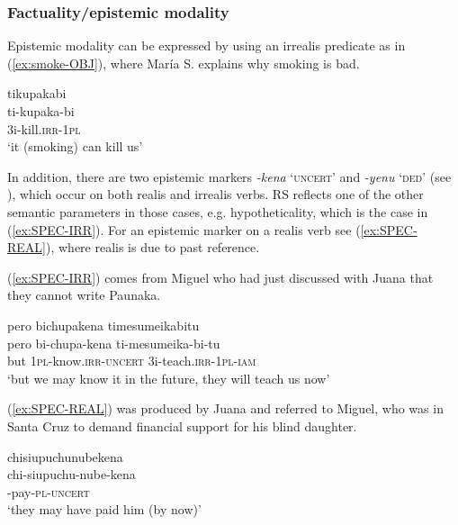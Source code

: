 \subsubsection{Factuality/epistemic modality}\label{par:IRR-factuality_epistemic_modality}

Epistemic modality can be expressed by using an irrealis predicate as in (\ref{ex:smoke-OBJ}), where María S. explains why smoking is bad.

\ea\label{ex:smoke-OBJ}
\begingl
\glpreamble tikupakabi\\
\gla ti-kupaka-bi\\
\glb 3i-kill.\textsc{irr}-1\textsc{pl}\\
\glft ‘it (smoking) can kill us’
\endgl
 \trailingcitation{[rxx-e120511l.385]}
\xe
{}

In addition, there are two epistemic markers  \textit{-kena} ‘\textsc{uncert}’ and \textit{-yenu} ‘\textsc{ded}’ (see ), which occur on both realis and irrealis verbs. RS reflects one of the other semantic parameters in those cases, e.g. hypotheticality, which is the case in (\ref{ex:SPEC-IRR}). For an epistemic marker on a realis verb see (\ref{ex:SPEC-REAL}), where realis is due to past reference.

(\ref{ex:SPEC-IRR}) comes from Miguel who had just discussed with Juana that they cannot write Paunaka.

\ea\label{ex:SPEC-IRR}
\begingl 
\glpreamble pero bichupakena timesumeikabitu \\
\gla pero bi-chupa-kena ti-mesumeika-bi-tu\\ 
\glb but 1\textsc{pl}-know.\textsc{irr}-\textsc{uncert} 3i-teach.\textsc{irr}-1\textsc{pl}-\textsc{iam}\\ 
\glft ‘but we may know it in the future, they will teach us now’\\ 
\endgl
 \trailingcitation{[jmx-e090727s.031]}
\xe

(\ref{ex:SPEC-REAL}) was produced by Juana and referred to Miguel, who was in Santa Cruz to demand financial support for his blind daughter.

\ea\label{ex:SPEC-REAL}
\begingl 
\glpreamble chisiupuchunubekena\\
\gla chi-siupuchu-nube-kena\\ 
-pay-\textsc{pl}-\textsc{uncert}\\ 
\glft ‘they may have paid him (by now)’\\ 
\endgl
 \trailingcitation{[jxx-p120430l-1.084]}
\xe



